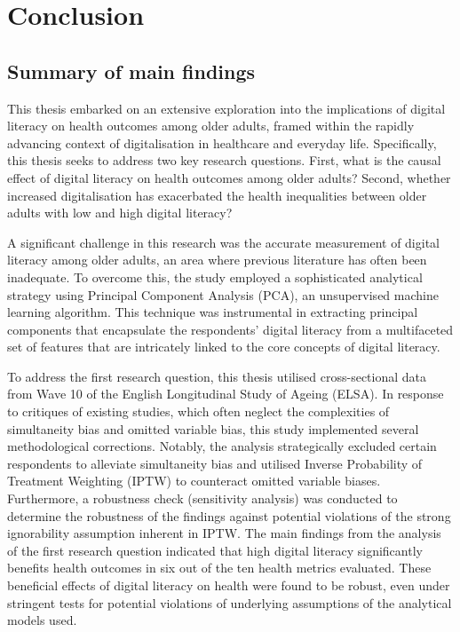 \chapter{\label{ch:7-conclusion}Conclusion}

\section{Summary of main findings}
This thesis embarked on an extensive exploration into the implications of digital literacy on health outcomes among older adults, framed within the rapidly advancing context of digitalisation in healthcare and everyday life. Specifically, this thesis seeks to address two key research questions. First, what is the causal effect of digital literacy on health outcomes among older adults? Second, whether increased digitalisation has exacerbated the health inequalities between older adults with low and high digital literacy?

A significant challenge in this research was the accurate measurement of digital literacy among older adults, an area where previous literature has often been inadequate. To overcome this, the study employed a sophisticated analytical strategy using Principal Component Analysis (PCA), an unsupervised machine learning algorithm. This technique was instrumental in extracting principal components that encapsulate the respondents' digital literacy from a multifaceted set of features that are intricately linked to the core concepts of digital literacy.

To address the first research question, this thesis utilised cross-sectional data from Wave 10 of the English Longitudinal Study of Ageing (ELSA). In response to critiques of existing studies, which often neglect the complexities of simultaneity bias and omitted variable bias, this study implemented several methodological corrections. Notably, the analysis strategically excluded certain respondents to alleviate simultaneity bias and utilised Inverse Probability of Treatment Weighting (IPTW) to counteract omitted variable biases. Furthermore, a robustness check (sensitivity analysis) was conducted to determine the robustness of the findings against potential violations of the strong ignorability assumption inherent in IPTW. The main findings from the analysis of the first research question indicated that high digital literacy significantly benefits health outcomes in six out of the ten health metrics evaluated. These beneficial effects of digital literacy on health were found to be robust, even under stringent tests for potential violations of underlying assumptions of the analytical models used.

